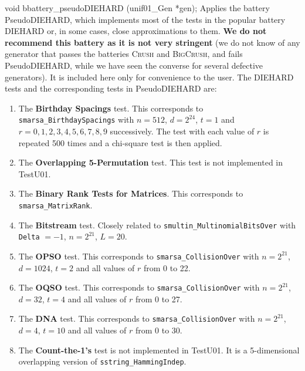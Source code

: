 void bbattery_pseudoDIEHARD (unif01_Gen *gen);
\endcode
  \tab 
  Applies the battery PseudoDIEHARD, which implements most of 
  the tests in the popular battery DIEHARD \cite{rMAR96b}
  or, in some cases, close approximations to them. \textbf{We do not recommend
  this battery as it is not very stringent} (we do not know of any generator
  that passes the batteries \textsc{Crush} and  \textsc{BigCrush}, and
  fails PseudoDIEHARD, while we have seen the converse for several defective
  generators). It is included here only for convenience to the user.
  The DIEHARD tests and the corresponding tests in  PseudoDIEHARD are:
  \endtab

\begin{enumerate}

\item The {\bf Birthday Spacings} test. This corresponds
  to {\tt smarsa\_BirthdaySpacings} with $n=512$, $d=2^{24}$, $t=1$ and
  $r=0, 1, 2, 3, 4, 5, 6, 7, 8, 9$ successively. The test with each 
 value of $r$ is repeated 500 times and a chi-square test is then applied.

\item The {\bf Overlapping 5-Permutation} test. This test is not
implemented in TestU01.

\item The {\bf Binary Rank Tests for Matrices}. This corresponds 
 to {\tt smarsa\_MatrixRank}.

\item The {\bf Bitstream} test.  Closely related to
 {\tt smultin\_MultinomialBitsOver} with  {\tt Delta} $= -1$,
 $n=2^{21}$, $L=20$.

\item The {\bf OPSO} test. This corresponds to {\tt smarsa\_CollisionOver}
 with $n=2^{21}$, $d=1024$, $t=2$ and all values of $r$ from 0 to 22.

\item The {\bf OQSO} test. This corresponds to {\tt smarsa\_CollisionOver}
 with $n=2^{21}$, $d=32$, $t=4$ and all values of $r$ from 0 to 27.

\item The {\bf DNA} test. This corresponds to {\tt smarsa\_CollisionOver}
 with $n=2^{21}$, $d=4$, $t=10$ and all values of $r$ from 0 to 30.

\item The {\bf Count-the-1's} test is not implemented in TestU01. It is
a 5-dimensional overlapping version of {\tt sstring\_HammingIndep}.


\end{enumerate}
